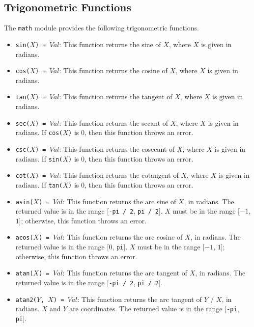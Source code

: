 \subsection{Trigonometric Functions}
The \texttt{math} module provides the following trigonometric functions.
\begin{itemize}
\item \texttt{sin($X$) = $Val$}: This function returns the sine of $X$, where $X$ is given in radians.
\item \texttt{cos($X$) = $Val$}: This function returns the cosine of $X$, where $X$ is given in radians.
\item \texttt{tan($X$) = $Val$}: This function returns the tangent of $X$, where $X$ is given in radians.  
\item \texttt{sec($X$) = $Val$}: This function returns the secant of $X$, where $X$ is given in radians.  If \texttt{cos($X$)} is $0$, then this function throws an error.
\item \texttt{csc($X$) = $Val$}: This function returns the cosecant of $X$, where $X$ is given in radians.  If \texttt{sin($X$)} is $0$, then this function throws an error.
\item \texttt{cot($X$) = $Val$}: This function returns the cotangent of $X$, where $X$ is given in radians.  If \texttt{tan($X$)} is $0$, then this function throws an error.
\item \texttt{asin($X$) = $Val$}: This function returns the arc sine of $X$, in radians.  The returned value is in the range [\texttt{-pi / 2}, \texttt{pi / 2}].  $X$ must be in the range [$-1$, $1$]; otherwise, this function throws an error.
\item \texttt{acos($X$) = $Val$}: This function returns the arc cosine of $X$, in radians.  The returned value is in the range [$0$, \texttt{pi}].  $X$ must be in the range [$-1$, $1$]; otherwise, this function throws an error.
\item \texttt{atan($X$) = $Val$}: This function returns the arc tangent of $X$, in radians.  The returned value is in the range [\texttt{-pi / 2}, \texttt{pi / 2}].
\item \texttt{atan2($Y$, $X$) = $Val$}: This function returns the arc tangent of $Y$ / $X$, in radians.  $X$ and $Y$ are coordinates.  The returned value is in the range [\texttt{-pi}, \texttt{pi}].  

\end{itemize}
